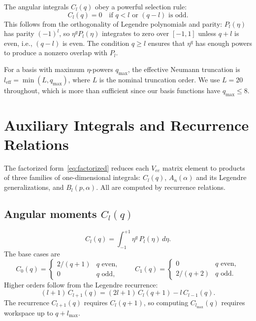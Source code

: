 \documentclass[aps,pra,twocolumn,superscriptaddress,longbibliography]{revtex4-2}
\begin{document}
The angular integrals $C_l(q)$ obey a powerful selection rule:
\begin{equation}
  C_l(q) = 0 \quad\text{if } q < l \text{ or } (q - l)
  \text{ is odd}.
  \label{eq:selection_rule}
\end{equation}
This follows from the orthogonality of Legendre polynomials
and parity: $P_l(\eta)$ has parity $(-1)^l$, so
$\eta^q P_l(\eta)$ integrates to zero over $[-1,1]$ unless
$q + l$ is even, i.e., $(q - l)$ is even.  The condition
$q \geq l$ ensures that $\eta^q$ has enough powers to produce
a nonzero overlap with $P_l$.

For a basis with maximum $\eta$-powers $q_{\max}$, the
effective Neumann truncation is $l_{\mathrm{eff}} =
\min(L, q_{\max})$, where $L$ is the nominal truncation
order.  We use $L = 20$ throughout, which is more than
sufficient since our basis functions have $q_{\max} \leq 8$.


\section{Auxiliary Integrals and Recurrence Relations}
\label{sec:auxiliary}

The factorized form~\eqref{eq:factorized} reduces each
$V_{ee}$ matrix element to products of three families of
one-dimensional integrals: $C_l(q)$, $A_n(\alpha)$ and
its Legendre generalizations, and $B_l(p, \alpha)$.  All
are computed by recurrence relations.

\subsection{Angular moments \texorpdfstring{$C_l(q)$}{Cl(q)}}

\begin{equation}
  C_l(q) = \int_{-1}^{+1}\eta^q\,P_l(\eta)\,d\eta.
  \label{eq:Cl_def}
\end{equation}
The base cases are
\begin{equation}
  C_0(q) = \begin{cases} 2/(q+1) & q\text{ even}, \\ 0 & q\text{ odd},\end{cases}
  \qquad
  C_1(q) = \begin{cases} 0 & q\text{ even}, \\ 2/(q+2) & q\text{ odd}.\end{cases}
\end{equation}
Higher orders follow from the Legendre recurrence:
\begin{equation}
  (l+1)\,C_{l+1}(q) = (2l+1)\,C_l(q+1) - l\,C_{l-1}(q).
  \label{eq:Cl_recurrence}
\end{equation}
The recurrence $C_{l+1}(q)$ requires $C_l(q+1)$, so computing
$C_{l_{\max}}(q)$ requires workspace up to $q + l_{\max}$.
\end{document}
